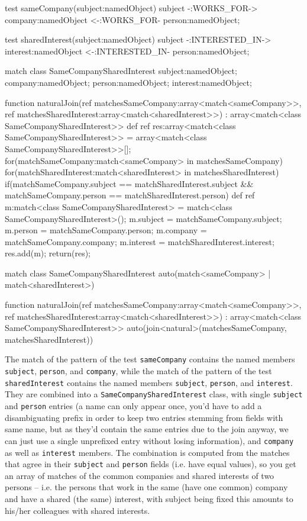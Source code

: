\begin{example}
  \begin{grgen}
test sameCompany(subject:namedObject)
{
	subject -:WORKS_FOR-> company:namedObject <-:WORKS_FOR- person:namedObject;
}

test sharedInterest(subject:namedObject)
{
	subject -:INTERESTED_IN-> interest:namedObject <-:INTERESTED_IN- person:namedObject;
}

match class SameCompanySharedInterest
{
	subject:namedObject;
	company:namedObject;
	person:namedObject;
	interest:namedObject;
}

function naturalJoin(ref matchesSameCompany:array<match<sameCompany>>, ref matchesSharedInterest:array<match<sharedInterest>>) : array<match<class SameCompanySharedInterest>>
{
	def ref res:array<match<class SameCompanySharedInterest>> = array<match<class SameCompanySharedInterest>>[];
	for(matchSameCompany:match<sameCompany> in matchesSameCompany)
	{
		for(matchSharedInterest:match<sharedInterest> in matchesSharedInterest)
		{
			if(matchSameCompany.subject == matchSharedInterest.subject && matchSameCompany.person == matchSharedInterest.person) {
				def ref m:match<class SameCompanySharedInterest> = match<class SameCompanySharedInterest>();
				m.subject = matchSameCompany.subject;
				m.person = matchSameCompany.person;
				m.company = matchSameCompany.company;
				m.interest = matchSharedInterest.interest;
				res.add(m);
			}
		}
	}
	return(res);
}
  \end{grgen}\label{exjoins}
	
	\begin{grgen}
match class SameCompanySharedInterest
{
	auto(match<sameCompany> | match<sharedInterest>)
}

function naturalJoin(ref matchesSameCompany:array<match<sameCompany>>, ref matchesSharedInterest:array<match<sharedInterest>>) : array<match<class SameCompanySharedInterest>>
{
	auto(join<natural>(matchesSameCompany, matchesSharedInterest))
}
  \end{grgen}
\end{example}

The match of the pattern of the test \texttt{sameCompany} contains the named members \texttt{subject}, \texttt{person}, and \texttt{company}, while the match of the pattern of the test \texttt{sharedInterest} contains the named members \texttt{subject}, \texttt{person}, and \texttt{interest}.
They are combined into a \texttt{SameCompanySharedInterest} class, with single \texttt{subject} and \texttt{person} entries (a name can only appear once, you'd have to add a disambiguating prefix in order to keep two entries stemming from fields with same name, but as they'd contain the same entries due to the join anyway, we can just use a single unprefixed entry without losing information), and \texttt{company} as well as \texttt{interest} members.
The combination is computed from the matches that agree in their \texttt{subject} and \texttt{person} fields (i.e. have equal values), so you get an array of matches of the common companies and shared interests of two persons -- i.e. the persons that work in the same (have one common) company and have a shared (the same) interest, with subject being fixed this amounts to his/her colleagues with shared interests.

